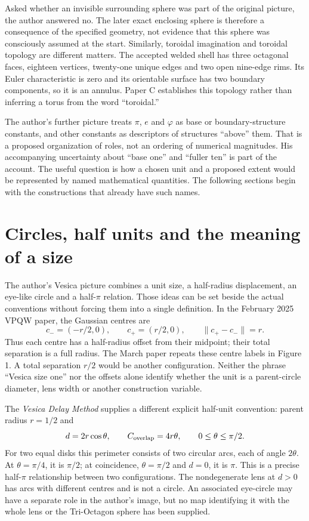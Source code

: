 \documentclass[11pt,a4paper]{article}
\newcommand{\ph}{\varphi}\newcommand{\Li}{\operatorname{Li}}\newcommand{\conv}{\operatorname{conv}}
\begin{document}
Asked whether an invisible surrounding sphere was part of the original picture, the author answered no. The later exact enclosing sphere is therefore a consequence of the specified geometry, not evidence that this sphere was consciously assumed at the start. Similarly, toroidal imagination and toroidal topology are different matters. The accepted welded shell has three octagonal faces, eighteen vertices, twenty-one unique edges and two open nine-edge rims. Its Euler characteristic is zero and its orientable surface has two boundary components, so it is an annulus. Paper C establishes this topology rather than inferring a torus from the word ``toroidal.''\cite{PC,SP}

The author's further picture treats $\pi$, $e$ and $\ph$ as base or boundary-structure constants, and other constants as descriptors of structures ``above'' them. That is a proposed organization of roles, not an ordering of numerical magnitudes. His accompanying uncertainty about ``base one'' and ``fuller ten'' is part of the account. The useful question is how a chosen unit and a proposed extent would be represented by named mathematical quantities. The following sections begin with the constructions that already have such names.~\cite{Intent}

\section{Circles, half units and the meaning of a size}
The author's Vesica picture combines a unit size, a half-radius displacement, an eye-like circle and a half-$\pi$ relation. Those ideas can be set beside the actual conventions without forcing them into a single definition. In the February 2025 VPQW paper, the Gaussian centres are
\begin{equation}\label{eq:centres}
c_- =(-r/2,0),\qquad c_+=(r/2,0),\qquad \|c_+-c_-\|=r.
\end{equation}
Thus each centre has a half-radius offset from their midpoint; their total separation is a full radius. The March paper repeats these centre labels in Figure 1. A total separation $r/2$ would be another configuration. Neither the phrase ``Vesica size one'' nor the offsets alone identify whether the unit is a parent-circle diameter, lens width or another construction variable.~\cite[Sec.~5.2, p.~3]{VPQW}~\cite[Fig.~1; Sec.~2]{Fractal}

The \emph{Vesica Delay Method} supplies a different explicit half-unit convention: parent radius $r=1/2$ and
\begin{equation}\label{eq:vesica}
d=2r\cos\theta,\qquad C_{\rm overlap}=4r\theta,
\qquad 0\leq\theta\leq\pi/2.
\end{equation}
For two equal disks this perimeter consists of two circular arcs, each of angle $2\theta$. At $\theta=\pi/4$, it is $\pi/2$; at coincidence, $\theta=\pi/2$ and $d=0$, it is $\pi$. This is a precise half-$\pi$ relationship between two configurations. The nondegenerate lens at $d>0$ has arcs with different centres and is not a circle. An associated eye-circle may have a separate role in the author's image, but no map identifying it with the whole lens or the Tri-Octagon sphere has been supplied.~\cite[p.~1, Eqs.~(1)--(2)]{Delay}
\end{document}
